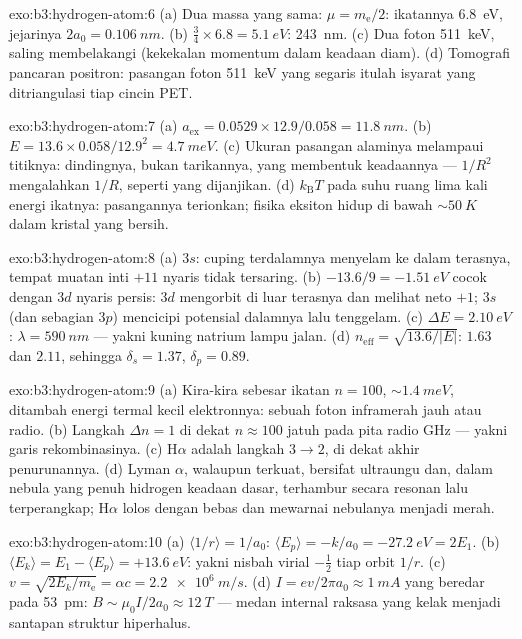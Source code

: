 \begin{solution}{exo:b3:hydrogen-atom:6}
(a) Dua massa yang sama: $\mu = m_{\text{e}}/2$: ikatannya
\qty{6.8}{eV}, jejarinya $2a_0 = \qty{0.106}{nm}$. (b) $\tfrac34
\times 6.8 = \qty{5.1}{eV}$: \qty{243}{nm}. (c) Dua foton
\qty{511}{keV}, saling membelakangi (kekekalan momentum dalam keadaan
diam). (d) Tomografi pancaran positron: pasangan foton \qty{511}{keV}
yang segaris itulah isyarat yang ditriangulasi tiap cincin PET.
\end{solution}

\begin{solution}{exo:b3:hydrogen-atom:7}
(a) $a_{\text{ex}} = 0.0529 \times 12.9/0.058 = \qty{11.8}{nm}$.
(b) $E = 13.6 \times 0.058/12.9^2 = \qty{4.7}{meV}$. (c) Ukuran
pasangan alaminya melampaui titiknya: dindingnya, bukan tarikannya,
yang membentuk keadaannya --- $1/R^2$ mengalahkan $1/R$, seperti yang
dijanjikan. (d)
$k_{\text{B}}T$ pada suhu ruang lima kali energi ikatnya: pasangannya
terionkan; fisika eksiton hidup di bawah $\sim\qty{50}{K}$ dalam
kristal yang bersih.
\end{solution}

\begin{solution}{exo:b3:hydrogen-atom:8}
(a) $3s$: cuping terdalamnya menyelam ke dalam terasnya, tempat muatan
inti $+11$ nyaris tidak tersaring. (b) $-13.6/9 = \qty{-1.51}{eV}$
cocok dengan $3d$ nyaris persis: $3d$ mengorbit di luar terasnya dan
melihat neto $+1$; $3s$ (dan sebagian $3p$) mencicipi potensial dalamnya
lalu tenggelam. (c) $\Delta E = \qty{2.10}{eV}$: $\lambda = \qty{590}{nm}$
--- yakni kuning natrium lampu jalan. (d) $n_{\text{eff}} =
\sqrt{13.6/|E|}$: $1.63$ dan $2.11$, sehingga $\delta_s = 1.37$,
$\delta_p = 0.89$.
\end{solution}

\begin{solution}{exo:b3:hydrogen-atom:9}
(a) Kira-kira sebesar ikatan $n = 100$, $\sim\qty{1.4}{meV}$, ditambah
energi termal kecil elektronnya: sebuah foton inframerah jauh atau
radio. (b) Langkah $\Delta n = 1$ di dekat $n \approx 100$ jatuh pada
pita radio GHz --- yakni garis rekombinasinya. (c) H$\alpha$ adalah langkah $3 \to
2$, di dekat akhir penurunannya. (d) Lyman $\alpha$,
walaupun terkuat, bersifat ultraungu dan, dalam nebula yang penuh
hidrogen keadaan dasar, terhambur secara resonan lalu terperangkap;
H$\alpha$ lolos dengan bebas dan mewarnai nebulanya menjadi merah.
\end{solution}

\begin{solution}{exo:b3:hydrogen-atom:10}
(a) $\langle 1/r\rangle = 1/a_0$: $\langle E_p\rangle = -k/a_0 =
\qty{-27.2}{eV} = 2E_1$. (b) $\langle E_k\rangle = E_1 - \langle
E_p\rangle = +\qty{13.6}{eV}$: yakni nisbah virial $-\tfrac12$ tiap
orbit $1/r$. (c) $v = \sqrt{2E_k/m_{\text{e}}} = \alpha c =
\qty{2.2e6}{m/s}$. (d) $I = ev/2\pi a_0 \approx \qty{1}{mA}$
yang beredar pada \qty{53}{pm}: $B \sim \mu_0I/2a_0 \approx
\qty{12}{T}$ --- medan internal raksasa yang kelak menjadi santapan
struktur hiperhalus.
\end{solution}

